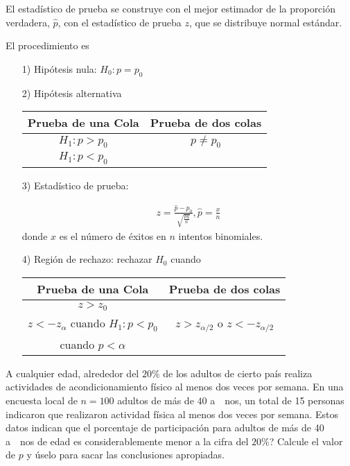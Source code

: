 El estad\'istico de prueba se construye con el mejor estimador de la proporci\'on verdadera, $\hat{p}$, con el estad\'istico de prueba $z$, que se distribuye normal est\'andar.

El procedimiento es
\begin{itemize}
\item[1) ] Hip\'otesis nula: $H_{0}:p=p_{0}$
\item[2) ] Hip\'otesis alternativa

\begin{tabular}{cc}\hline
\textbf{Prueba de una Cola} & \textbf{Prueba de dos colas}\\\hline
$H_{1}:p>p_{0}$ & $p\neq p_{0}$\\
$H_{1}:p<p_{0}$ & \\
\end{tabular}

\item[3) ] Estad\'istico de prueba:

\begin{eqnarray*}
z=\frac{\hat{p}-p_{0}}{\sqrt{\frac{pq}{n}}},\hat{p}=\frac{x}{n}
\end{eqnarray*}
donde $x$ es el n\'umero de \'exitos en $n$ intentos binomiales.

\item[4) ] Regi\'on de rechazo: rechazar $H_{0}$ cuando

\begin{tabular}{cc}\hline
\textbf{Prueba de una Cola} & \textbf{Prueba de dos colas}\\\hline
$z>z_{0}$ & \\
$z<-z_{\alpha}$ cuando $H_{1}:p<p_{0}$&$z>z_{\alpha/2}$ o $z<-z_{\alpha/2}$\\
 cuando $p<\alpha$&\\
\end{tabular}
\end{itemize}

\begin{Ejem}
A cualquier edad, alrededor del $20\%$ de los adultos de cierto pa\'is realiza actividades de acondicionamiento f\'isico al menos dos veces por semana. En una encuesta local de $n=100$ adultos de m\'as de $40$ a\ ~nos, un total de 15 personas indicaron que realizaron actividad f\'isica al menos dos veces por semana. Estos datos indican que el porcentaje de participaci\'on para adultos de m\'as de 40 a\ ~nos de edad es  considerablemente menor a la cifra del $20\%$? Calcule el valor de $p$ y \'uselo para sacar las conclusiones apropiadas.
\end{Ejem}

